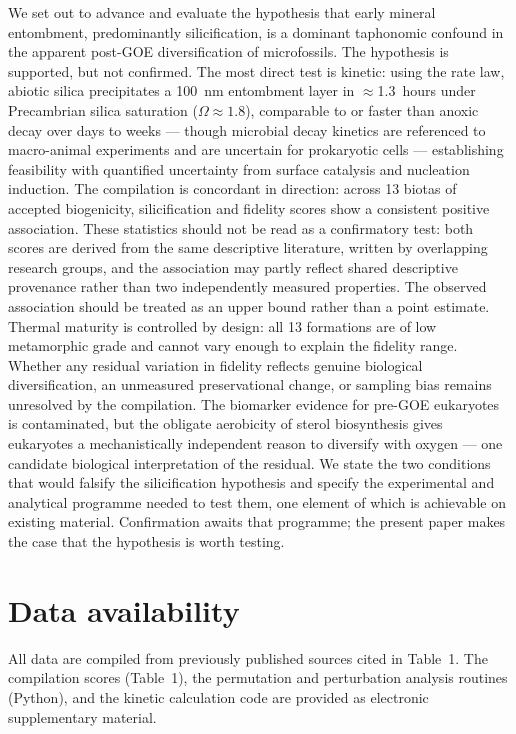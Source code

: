 \documentclass[11pt]{article}
\begin{document}
We set out to advance and evaluate the hypothesis that early mineral entombment, predominantly
silicification, is a dominant taphonomic confound in the apparent post-GOE diversification of
microfossils. The hypothesis is supported, but not confirmed. The most direct test is kinetic:
using the \citet{Rimstidt1980} rate law, abiotic silica precipitates a 100~nm entombment layer in
$\approx$1.3~hours under Precambrian silica saturation ($\Omega \approx 1.8$), comparable to or
faster than anoxic decay over days to weeks \citep{TaxonRedox2025} --- though microbial decay kinetics
are referenced to macro-animal experiments and are uncertain for prokaryotic cells --- establishing
feasibility with quantified uncertainty from surface catalysis and nucleation induction. The
compilation is concordant in direction: across 13 biotas of accepted biogenicity, silicification and
fidelity scores show a consistent positive association. These statistics should not be read as a
confirmatory test:
both scores are derived from the same descriptive literature, written by overlapping research groups,
and the association may partly reflect shared descriptive provenance rather than two independently
measured properties. The observed association should be treated as an upper bound rather than a point
estimate. Thermal maturity is controlled by design: all 13 formations are of low metamorphic grade
and cannot vary enough to explain the fidelity range. Whether any residual variation in fidelity
reflects genuine biological diversification, an unmeasured preservational change, or sampling bias
remains unresolved by the compilation. The biomarker evidence for pre-GOE
eukaryotes is contaminated, but the obligate aerobicity of sterol biosynthesis gives eukaryotes a
mechanistically independent reason to diversify with oxygen --- one candidate biological interpretation
of the residual. We state the two conditions that would falsify the silicification hypothesis and
specify the experimental and analytical programme needed to test them, one element of which is
achievable on existing material. Confirmation awaits that programme; the present paper makes the case
that the hypothesis is worth testing.

\section*{Data availability}
All data are compiled from previously published sources cited in Table~1. The compilation scores
(Table~1), the permutation and perturbation analysis routines (Python), and the kinetic calculation
code are provided as electronic supplementary material.
\end{document}
